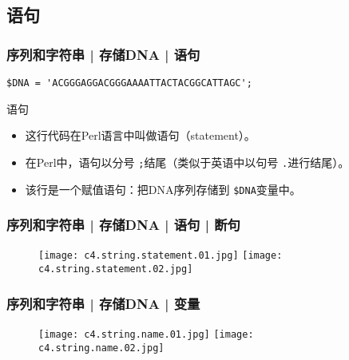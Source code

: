 \subsection{语句}
\begin{frame}[fragile]
  \frametitle{序列和字符串 | 存储DNA | \alert{语句}}
\begin{lstlisting}
$DNA = 'ACGGGAGGACGGGAAAATTACTACGGCATTAGC';
\end{lstlisting}
\pause
\begin{block}{语句}
  \begin{itemize}
    \item 这行代码在Perl语言中叫做语句（statement）。
    \item 在Perl中，语句以分号 \verb|;|结尾（类似于英语中以句号 \verb|.|进行结尾）。
    \item 该行是一个赋值语句：把DNA序列存储到 \verb|$DNA|变量中。
  \end{itemize}
\end{block}
\end{frame}

\begin{frame}
  \frametitle{序列和字符串 | 存储DNA | 语句 | 断句}
  \begin{figure}
    \centering
    \texttt{[image: c4.string.statement.01.jpg]}
    \quad
    \texttt{[image: c4.string.statement.02.jpg]}
  \end{figure}
\end{frame}

\begin{frame}
  \frametitle{序列和字符串 | 存储DNA | 变量}
  \begin{figure}
    \centering
    \texttt{[image: c4.string.name.01.jpg]}
    \quad
    \texttt{[image: c4.string.name.02.jpg]}
  \end{figure}
\end{frame}

